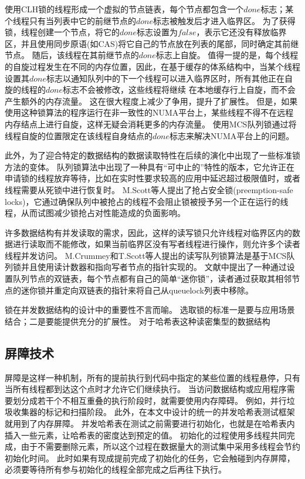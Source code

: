 使用CLH锁的线程形成一个虚拟的节点链表，每个节点都包含一个$done$标志；某个线程只有当列表中它的前继节点的$done$标志被触发后才进入临界区。
为了获得锁，线程创建一个节点，将它的$done$标志设置为$false$，表示它还没有释放临界区，并且使用同步原语(如CAS)将它自己的节点放在列表的尾部，同时确定其前继节点。
随后，该线程在其前继节点的$done$标志上自旋。
值得一提的是，每个线程的自旋过程发生在不同的内存位置，因此，在基于缓存的体系结构中，当某个线程设置其$done$标志以通知队列中的下一个线程可以进入临界区时，所有其他正在自旋的线程的$done$标志不会被修改，这些线程将继续 在本地缓存行上自旋，而不会产生额外的内存流量。
这在很大程度上减少了争用，提升了扩展性。
但是，如果使用这种锁算法的程序运行在非一致性的NUMA平台上，某些线程不得不在远程内存结点上进行自旋，这样无疑会消耗更多的内存流量。
使用MCS队列锁\cite{mellor1991algorithms}通过将线程自旋的位置限定在该线程自身结点的$done$标志来解决NUMA平台上的问题。

此外，为了迎合特定的数据结构的数据读取特性在后续的演化中出现了一些标准锁方法的变体。
队列锁算法中出现了一种具有“可中止的”特性的版本，它允许正在申请锁的线程放弃等待，比如在实时性要求较高的应用中延迟超过极限值时\cite{scott2002non,scott2001scalable}，或者线程需要从死锁中进行恢复时。
M.Scott等人提出了抢占安全锁(preemption-safe locks)\cite{michael1998nonblocking}，它通过确保队列中被抢占的线程不会阻止锁被授予另一个正在运行的线程，从而试图减少锁抢占对性能造成的负面影响。

许多数据结构有并发读取的需求，因此，这样的读写锁只允许线程对临界区内的数据进行读取而不能修改，如果当前临界区没有写者线程进行操作，则允许多个读者线程并发访问。
M.Crummey和T.Scott等人提出的读写队列锁算法是基于MCS队列锁并且使用读计数器和指向写者节点的指针实现的\cite{mellor1991scalable}。
文献\cite{krieger1993fair}中提出了一种通过设置队列节点的双链表，每个节点都有自己的简单“迷你锁”，读者通过获取其相邻节点的迷你锁并重定向双链表的指针来将自己从queuelock列表中移除。

锁在并发数据结构的设计中的重要性不言而喻。
选取锁的标准一是要与应用场景结合；二是要能提供充分的扩展性。
对于哈希表这种读密集型的数据结构

\subsection{屏障技术}

屏障是这样一种机制，所有的提前执行到代码中指定的某些位置的线程悬停，只有当所有线程都到达这个点时才允许它们继续执行。 当访问数据结构或应用程序需要划分成若干个不相互重叠的执行阶段时，就需要使用内存障碍。
例如，并行垃圾收集器的标记和扫描阶段。
此外，在本文中设计的统一的并发哈希表测试框架就用到了内存屏障。
并发哈希表在测试之前需要进行初始化，也就是在哈希表内插入一些元素，让哈希表的密度达到预定的值。
初始化的过程使用多线程共同完成，由于不需要删除元素，所以这个过程在数据量大的测试集中采用多线程会节约初始化时间。
此时如果有现成提前完成了初始化的任务，它会触碰到内存屏障，必须要等待所有参与初始化的线程全部完成之后再往下执行。

